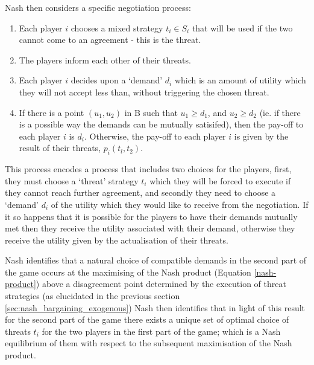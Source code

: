 Nash then considers a specific negotiation process:
\begin{enumerate}
\item Each player $i$ chooses a mixed strategy $t_i\in S_i$ that will be used if the two cannot come to an agreement - this is the threat.
\item The players inform each other of their threats.
\item Each player $i$ decides upon a `demand' $d_i$ which is an amount of utility which they will not accept less than, without triggering the chosen threat.
\item If there is a point $(u_1,u_2)$ in B such that $u_1 \ge d_1$, and $u_2 \ge d_2$ (ie. if there is a possible way the demands can be mutually satisifed), then the pay-off to each player $i$ is $d_i$. Otherwise, the pay-off to each player $i$ is given by the result of their threats, $p_i(t_l, t_2)$.
\end{enumerate}

This process encodes a process that includes two choices for the players, first, they must choose a `threat' strategy $t_i$ which they will be forced to execute if they cannot reach further agreement, and secondly they need to choose a `demand' $d_i$ of the utility which they would like to receive from the negotiation.
If it so happens that it is possible for the players to have their demands mutually met then they receive the utility associated with their demand, otherwise they receive the utility given by the actualisation of their threats.

Nash identifies that a natural choice of compatible demands in the second part of the game occurs at the maximising of the Nash product (Equation \ref{nash-product}) above a disagreement point determined by the execution of threat strategies (as elucidated in the previous section \ref{sec:nash_bargaining_exogenous})
Nash then identifies that in light of this result for the second part of the game there exists a unique set of optimal choice of threats $t_i$ for the two players in the first part of the game; which is a Nash equilibrium of them with respect to the subsequent maximisation of the Nash product.

